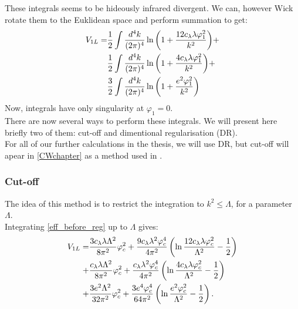 These integrals seems to be hideously infrared divergent. 
We can, however Wick rotate them to the Euklidean space and perform summation to get:
\begin{align}\label{eff_before_reg}
V_{1L}=&\frac{1}{2} \int\frac{d^4k}{(2\pi)^4}\ln{\left(1+\frac{12c_\lambda\lambda\varphi_1^2}{k^2}
\right)} +\\
&\frac{1}{2} \int\frac{d^4k}{(2\pi)^4}\ln{\left(1+\frac{4c_\lambda\lambda\varphi_1^2}{k^2}
\right)} +\\ 
&\frac{3}{2} \int\frac{d^4k}{(2\pi)^4}\ln{\left(1+\frac{e^2\varphi_1^2}{k^2}\right)}
\end{align}
Now, integrals have only singularity at $\varphi_1 = 0$. \\
There are now several ways to perform these integrals. We will present here briefly two of them: 
cut-off and
dimentional regularisation (DR). \\
For all of our further calculations in the thesis, we will use DR, 
but cut-off will apear in \ref{CWchapter} 
as a method used in \cite{Coleman1973}. \\
\subsubsection{Cut-off}
The idea of this method is to restrict the integration to $k^2 \leq \Lambda$, for a 
parameter $\Lambda$. \\
Integrating \ref{eff_before_reg} up to $\Lambda$ gives:
\begin{align}
V_{1L}=
&\frac{3c_\lambda\lambda\Lambda^2}{8\pi^2}\varphi_c^2+\frac{9c_\lambda\lambda^2\varphi_c^4}{4\pi^2}
\left(\ln\frac{12c_\lambda\lambda\varphi_c^2}{\Lambda^2}-\frac{1}{2}\right)  \notag \\
+&\frac{c_\lambda\lambda\Lambda^2}{8\pi^2}\varphi_c^2+\frac{c_\lambda\lambda^2\varphi_c^4}{4\pi^2}
\left(\ln\frac{4c_\lambda\lambda\varphi_c^2}{\Lambda^2}-\frac{1}{2}\right)  \notag \\
+&\frac{3e^2\Lambda^2}{32\pi^2}\varphi_c^2+\frac{3e^4\varphi_c^4}{64\pi^2}
\left(\ln\frac{e^2\varphi_c^2}{\Lambda^2}-\frac{1}{2}\right).
\end{align}

